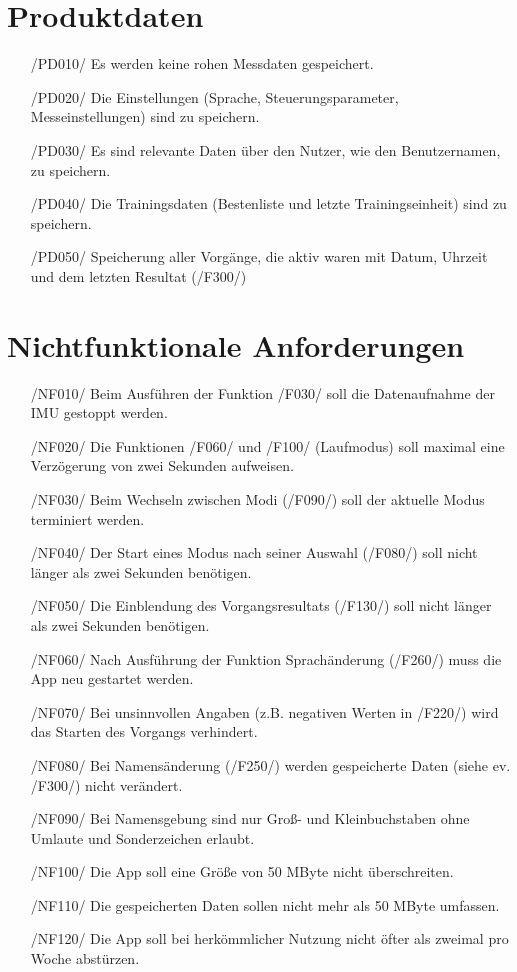 \documentclass[a4paper,12pt]{article}
\begin{document}
\section{Produktdaten}
\begin{itemize}
	\item[/PD010/] Es werden keine rohen Messdaten gespeichert.
	\item[/PD020/] Die Einstellungen (Sprache, Steuerungsparameter, Messeinstellungen) sind zu speichern. 
	\item[/PD030/] Es sind relevante Daten über den Nutzer, wie den Benutzernamen, zu speichern.
	\item[/PD040/] Die Trainingsdaten (Bestenliste und letzte Trainingseinheit) sind zu speichern. %
	\item[/PD050/] Speicherung aller Vorgänge, die aktiv waren mit Datum, Uhrzeit und dem letzten Resultat (/F300/)%
\end{itemize}


\section{Nichtfunktionale Anforderungen}

\begin{itemize}
  \item[/NF010/] Beim Ausführen der Funktion /F030/ soll die Datenaufnahme der IMU gestoppt werden.
  \item[/NF020/] Die Funktionen /F060/ und /F100/ (Laufmodus) soll maximal eine Verzögerung von zwei Sekunden aufweisen. %
  \item[/NF030/] Beim Wechseln zwischen Modi (/F090/) soll der aktuelle Modus terminiert werden.
  \item[/NF040/] Der Start eines Modus nach seiner Auswahl (/F080/) soll nicht länger als zwei Sekunden benötigen. %
  \item[/NF050/] Die Einblendung des Vorgangsresultats (/F130/) soll nicht länger als zwei Sekunden benötigen.%
  \item[/NF060/] Nach Ausführung der Funktion  Sprachänderung (/F260/) muss die App neu gestartet werden.
  \item[/NF070/] Bei unsinnvollen Angaben (z.B. negativen Werten in /F220/) wird das Starten des Vorgangs verhindert.
  \item[/NF080/] Bei Namensänderung (/F250/) werden gespeicherte Daten (siehe ev. /F300/) nicht verändert.
  \item[/NF090/] Bei Namensgebung sind nur Groß- und Kleinbuchstaben ohne Umlaute und Sonderzeichen erlaubt.
  \item[/NF100/] Die App soll eine Größe von 50 MByte nicht überschreiten.
  \item[/NF110/] Die gespeicherten Daten sollen nicht mehr als 50 MByte umfassen.
  \item[/NF120/] Die App soll bei herkömmlicher Nutzung nicht öfter als zweimal pro Woche abstürzen.
\end{itemize}
\end{document}
